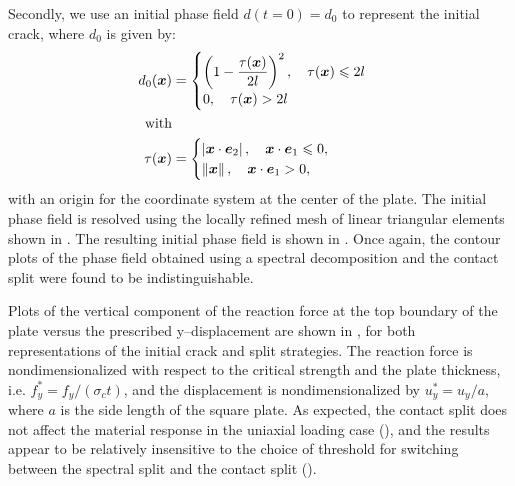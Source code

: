 

Secondly, we use an initial phase field $d(t = 0) = d_0$ to represent the initial crack, where $d_0$ is given by:
\begin{align}
  d_0(\boldsymbol{x})  & =                                           
  \begin{cases}
    \left( 1-\dfrac{\tau(\boldsymbol{x})}{2l} \right)^2, \quad \tau(\boldsymbol{x}) \leqslant 2l \\
    0, \quad  \tau(\boldsymbol{x}) > 2l
  \end{cases} \label{eq: mode1 initial damage} \\
  \mbox{with}  &                                             \\
  \tau(\boldsymbol{x}) & =                                           
  \begin{cases}
    \left\vert \boldsymbol{x}\cdot\boldsymbol{e}_2 \right\vert, \quad \boldsymbol{x}\cdot\boldsymbol{e}_1 \leqslant 0, \\
    \left\lVert\boldsymbol{x}\right\rVert, \quad \boldsymbol{x}\cdot\boldsymbol{e}_1 > 0,
  \end{cases}
\end{align}
with an origin for the coordinate system at the center of the plate. The initial phase field is resolved using the locally refined mesh of linear triangular elements shown in . The resulting initial phase field is shown in .  Once again, the contour plots of the phase field obtained using a spectral decomposition and the contact split were found to be indistinguishable.



Plots of the vertical component of the reaction force at the top boundary of the plate versus the prescribed y--displacement are shown in , for both representations of the initial crack and split strategies.  The reaction force is nondimensionalized with respect to the critical strength and the plate thickness, i.e. $f_y^* = f_y / (\sigma_c t)$, and the displacement is nondimensionalized by $u_y^* = u_y / a$, where $a$ is the side length of the square plate.  As expected, the contact split does not affect the material response in the uniaxial loading case (), and the results appear to be relatively insensitive to the choice of threshold for switching between the spectral split and the contact split ().

